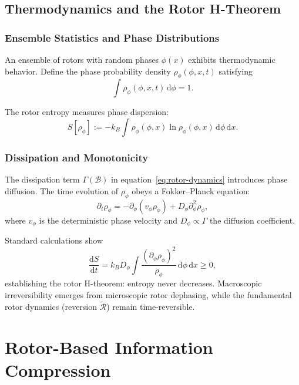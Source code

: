\documentclass[11pt,a4paper]{article}
\newcommand{\rev}[1]{\widetilde{#1}}           %
\newcommand{\Rotor}{\mathcal{R}}
\newcommand{\Biv}{\mathcal{B}}
\theoremstyle{definition}
\theoremstyle{plain}
\theoremstyle{remark}
\begin{document}
\subsection{Thermodynamics and the Rotor H-Theorem}

\subsubsection{Ensemble Statistics and Phase Distributions}

An ensemble of rotors with random phases $\phi(x)$ exhibits thermodynamic behavior. Define the phase probability density $\rho_\phi(\phi,x,t)$ satisfying
\begin{equation}
\int \rho_\phi(\phi,x,t)\, \mathrm{d}\phi = 1.
\end{equation}

The rotor entropy measures phase dispersion:
\begin{equation}
S[\rho_\phi] := -k_B \int \rho_\phi(\phi,x) \ln \rho_\phi(\phi,x)\, \mathrm{d}\phi\, \mathrm{d}x.
\end{equation}

\subsubsection{Dissipation and Monotonicity}

The dissipation term $\Gamma(\Biv)$ in equation~\eqref{eq:rotor-dynamics} introduces phase diffusion. The time evolution of $\rho_\phi$ obeys a Fokker--Planck equation:
\begin{equation}
\partial_t \rho_\phi = -\partial_\phi\!\left(v_\phi \rho_\phi\right) + D_\phi \partial_\phi^2 \rho_\phi,
\end{equation}
where $v_\phi$ is the deterministic phase velocity and $D_\phi \propto \Gamma$ the diffusion coefficient.

Standard calculations show
\begin{equation}
\frac{\mathrm{d}S}{\mathrm{d}t} = k_B D_\phi \int \frac{(\partial_\phi \rho_\phi)^2}{\rho_\phi}\, \mathrm{d}\phi\, \mathrm{d}x \geq 0,
\end{equation}
establishing the rotor H-theorem: entropy never decreases. Macroscopic irreversibility emerges from microscopic rotor dephasing, while the fundamental rotor dynamics (reversion $\rev{\Rotor}$) remain time-reversible.

\vspace{1em}

\section{Rotor-Based Information Compression}\label{sec:compression}
\end{document}
